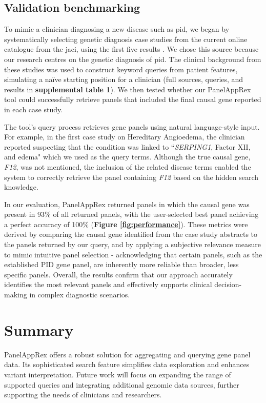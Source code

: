 \subsection{Validation benchmarking}
\noindent
To mimic a clinician diagnosing a new disease such as \ac{pid}, we began by systematically selecting genetic diagnosis case studies from the current online catalogue from the \ac{jaci}, using the first five results  \cite{arruda_genetic_2015, 
mcaleer_severe_2015,
verhoeven_hematopoietic_2022,
magerus-chatinet_autoimmune_2013,
sharfe_fatal_2014}. We chose this source because our research centres on the genetic diagnosis of \ac{pid}.
The clinical background from these studies was used to construct keyword queries from patient features, simulating a naïve starting position for a clinician (full sources, queries, and results in \textbf{supplemental table 1}). We then tested whether our PanelAppRex tool could successfully retrieve panels that included the final causal gene reported in each case study. 

The tool's query process retrieves gene panels using natural language-style input. For example, in the first case study on Hereditary Angioedema, the clinician reported suspecting that the condition was linked to ``\textit{SERPING1}, Factor XII, and edema" which we used as the query terms. Although the true causal gene, \textit{F12}, was not mentioned, the inclusion of the related disease terms enabled the system to correctly retrieve the panel containing \textit{F12} based on the hidden search knowledge.

In our evaluation, PanelAppRex returned panels in which the causal gene was present in 93\% of all returned panels, with the user-selected best panel achieving a perfect accuracy of 100\% 
(\textbf{Figure \ref{fig:performance}}).
 These metrics were derived by comparing the causal gene identified from the case study abstracts to the panels returned by our query, and by applying a subjective relevance measure to mimic intuitive panel selection - acknowledging that certain panels, such as the established PID gene panel, are inherently more reliable than broader, less specific panels. Overall, the results confirm that our approach accurately identifies the most relevant panels and effectively supports clinical decision-making in complex diagnostic scenarios.

\FloatBarrier
\section{Summary}
\noindent
PanelAppRex offers a robust solution for aggregating and querying gene panel data. Its sophisticated search feature simplifies data exploration and enhances variant interpretation. Future work will focus on expanding the range of supported queries and integrating additional genomic data sources, further supporting the needs of clinicians and researchers.

